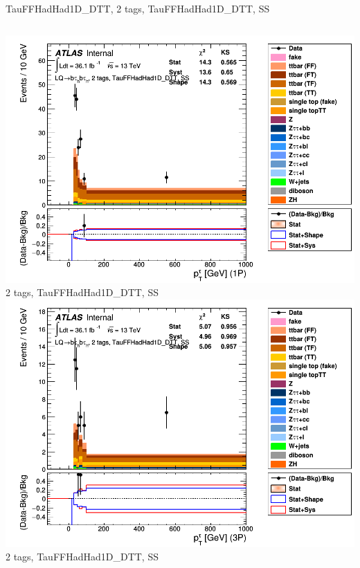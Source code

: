 \begin{frame}{TauFFHadHad1D\_DTT, 2 tags, TauFFHadHad1D\_DTT, SS}
  \begin{columns}[c]
    \centering\includegraphics[width=\textwidth]{C_2tag2pjet_0ptv_SS_TauPt1P}\\
    2 tags, TauFFHadHad1D\_DTT, SS
    \centering\includegraphics[width=\textwidth]{C_2tag2pjet_0ptv_SS_TauPt3P}\\
    2 tags, TauFFHadHad1D\_DTT, SS
  \end{columns}
  \begin{columns}[c]

\end{columns}
\end{frame}
